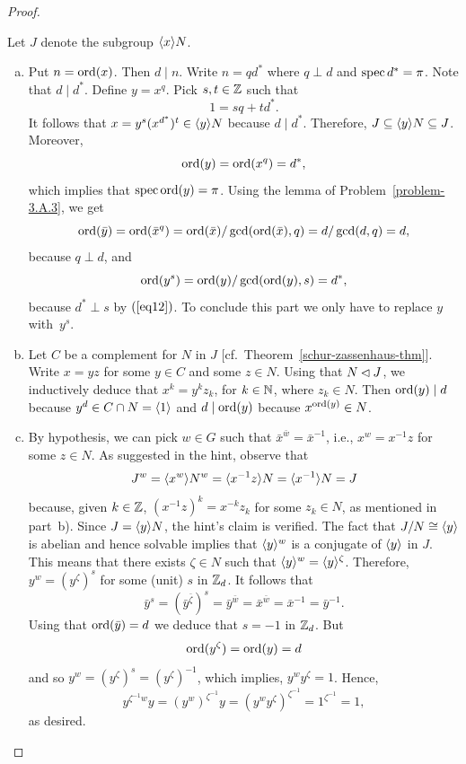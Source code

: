 \begin{proof}
\begin{solution} Let $J$ denote the subgroup $\langle x\rangle N$.

\begin{enumerate}[a),font=\upshape]
    \item Put $n={\rm ord}(x)$. Then $d\mid n$. Write $n=qd^*$ where $q\perp d$ and $\operatorname{spec}d^*=\pi$. Note that $d\mid d^*$. Define $y=x^q$. Pick $s,t\in\mathbb{Z}$ such that
    \begin{equation}\label{eq12}
        1 = sq + td^*.
    \end{equation}
    It follows that $x=y^s(x^{d^*})^t\in\langle y\rangle N$ because $d\mid d^*$. Therefore, $J\subseteq\langle y\rangle N\subseteq J$. Moreover,
    $$
        {\rm ord}(y) = {\rm ord}(x^q) = d^*,
    $$
    which implies that $\operatorname{spec}{\rm ord}(y)=\pi$. Using the lemma of Problem~\ref{problem-3.A.3}, we get
    $$
        {\rm ord}(\bar y)={\rm ord}(\bar x^q)={\rm ord}(\bar x)/\gcd({\rm ord}(\bar x),q)
            =d/\gcd(d,q)=d,
    $$
    because $q\perp d$, and
    $$
        {\rm ord}(y^s)= {\rm ord}(y)/\gcd({\rm ord}(y),s)=d^*,
    $$
    because $d^*\perp s$ by $(\ref{eq12})$. To conclude this part we only have to replace $y$ with~$y^s$.
    
    \item Let $C$ be a complement for $N$ in $J$ [cf.~Theorem~\ref{schur-zassenhaus-thm}]. Write $x=yz$ for some $y\in C$ and some $z\in N$. Using that $N\lhd J$, we inductively deduce that $x^k=y^kz_k$, for $k\in\mathbb{N}$, where $z_k\in N$. Then ${\rm ord}(y)\mid d$ because $y^d\in C\cap N=\langle1\rangle$ and $d\mid{\rm ord}(y)$ because $x^{{\rm ord}(y)}\in N$.

    \item By hypothesis, we can pick $w\in G$ such that $\bar x^{\bar w}=\bar x^{-1}$, i.e., $x^w=x^{-1}z$ for some $z\in N$. As suggested in the hint, observe that
    $$
        J^w = \langle x^w\rangle N^w = \langle x^{-1}z\rangle N =\langle x^{-1}\rangle N= J
    $$
    because, given $k\in\mathbb{Z}$, $(x^{-1}z)^k=x^{-k}z_k$ for some $z_k\in N$, as mentioned in part~b). Since $J=\langle y\rangle N$, the hint's claim is verified. The fact that $J/N\cong\langle y\rangle$ is abelian and hence solvable implies that $\langle y\rangle^w$ is a conjugate of $\langle y\rangle$ in $J$. This means that there exists $\zeta\in N$ such that $\langle y\rangle^w=\langle y\rangle^\zeta$. Therefore, $y^w=(y^\zeta)^s$ for some (unit) $s$ in $\mathbb{Z}_d$. It follows that
    $$
        \bar y^s=(\bar y^{\bar\zeta})^s=\bar y^{\bar w}=\bar x^{\bar w}=\bar x^{-1}=\bar y^{-1}.
    $$
    Using that ${\rm ord}(\bar y)=d$ we deduce that $s=-1$ in $\mathbb{Z}_d$. But
    $$
        {\rm ord}(y^\zeta)={\rm ord}(y)=d
    $$
    and so $y^w=(y^\zeta)^s=(y^\zeta)^{-1}$, which implies, $y^wy^\zeta=1$. Hence,
    $$
        y^{\zeta^{-1}w}y= (y^w)^{\zeta^{-1}}y=(y^wy^\zeta)^{\zeta^{-1}}=1^{\zeta^{-1}}=1,
    $$
    as desired.
\end{enumerate}
\end{solution}



\end{proof}
